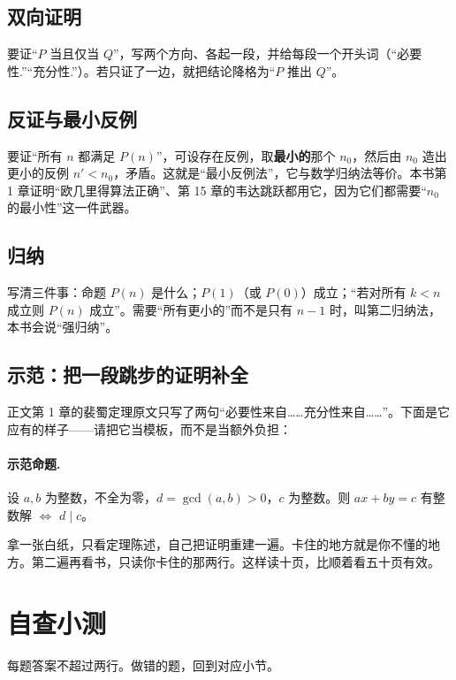 \documentclass[UTF8,a4paper,11pt,twoside,openright,fontset=fandol]{ctexbook}
\theoremstyle{definition}
\begin{document}
\subsection{双向证明}
要证“$P$ 当且仅当 $Q$”，写两个方向、各起一段，并给每段一个开头词（“必要性.”“充分性.”）。若只证了一边，就把结论降格为“$P$ 推出 $Q$”。

\subsection{反证与最小反例}
要证“所有 $n$ 都满足 $P(n)$”，可设存在反例，取\textbf{最小的}那个 $n_0$，然后由 $n_0$ 造出更小的反例 $n'<n_0$，矛盾。这就是“最小反例法”，它与数学归纳法等价。本书第 1 章证明“欧几里得算法正确”、第 15 章的韦达跳跃都用它，因为它们都需要“$n_0$ 的最小性”这一件武器。

\subsection{归纳}
写清三件事：命题 $P(n)$ 是什么；$P(1)$（或 $P(0)$）成立；“若对所有 $k<n$ 成立则 $P(n)$ 成立”。需要“所有更小的”而不是只有 $n-1$ 时，叫第二归纳法，本书会说“强归纳”。

\subsection{示范：把一段跳步的证明补全}
正文第 1 章的裴蜀定理原文只写了两句“必要性来自……充分性来自……”。下面是它应有的样子——请把它当模板，而不是当额外负担：

\paragraph{示范命题.}设 $a,b$ 为整数，不全为零，$d=\gcd(a,b)>0$，$c$ 为整数。则 $ax+by=c$ 有整数解 $\iff$ $d\mid c$。

\begin{tip}
拿一张白纸，只看定理陈述，自己把证明重建一遍。卡住的地方就是你不懂的地方。第二遍再看书，只读你卡住的那两行。这样读十页，比顺着看五十页有效。
\end{tip}

\section{自查小测}
每题答案不超过两行。做错的题，回到对应小节。
\end{document}
